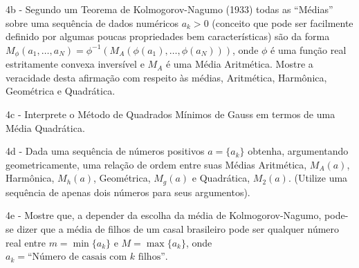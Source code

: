     4b - Segundo um Teorema de Kolmogorov-Nagumo (1933) todas as ``Médias'' sobre uma sequência de dados numéricos \(a_k > 0\) ({\small conceito que pode ser facilmente definido por algumas poucas propriedades bem características}) são da forma \(M_\phi(a_1, \ldots, a_N) = \phi^{-1}(M_A(\phi(a_1), \ldots, \phi(a_N)))\), onde \(\phi\) é uma função real estritamente convexa inversível e \(M_A\) é uma Média Aritmética. Mostre a veracidade desta afirmação com respeito às médias, Aritmética, Harmônica, Geométrica e Quadrática.

    4c - Interprete o Método de Quadrados Mínimos de Gauss em termos de uma Média Quadrática.

    4d - Dada uma sequência de números positivos \(a = \{a_k\}\) obtenha, argumentando geometricamente, uma relação de ordem entre suas Médias Aritmética, \(M_A(a)\), Harmônica, \(M_h(a)\), Geométrica, \(M_g(a)\) e Quadrática, \(M_2(a)\). (Utilize uma sequência de apenas dois números para seus argumentos).

    4e - Mostre que, a depender da escolha da média de Kolmogorov-Nagumo, pode-se dizer que a média de filhos de um casal brasileiro pode ser qualquer número real entre \(m = \min \{a_k\}\) e \(M = \max\{a_k\}\), onde \(a_k = \mbox{``Número de casais com } k \mbox{ filhos''}\).


